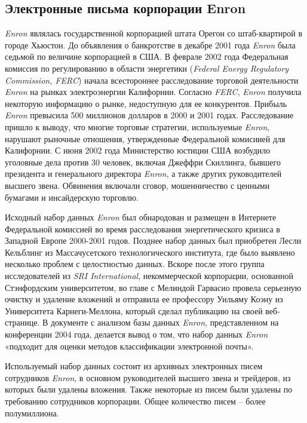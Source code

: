 \subsection{Электронные письма корпорации Enron}

\textit{Enron} являлась государственной корпорацией штата Орегон со штаб-квартирой в городе Хьюстон. До объявления о банкротстве в декабре 2001 года \textit{Enron} была седьмой по величине корпорацией в США. В феврале 2002 года Федеральная комиссия по регулированию в области энергетики 
(\textit{Federal Energy Regulatory Commission, FERC}) начала всестороннее расследование торговой деятельности \textit{Enron} на рынках электроэнергии Калифорнии. Согласно 
\textit{FERC}, \textit{Enron} получила некоторую информацию о рынке, недоступную для ее конкурентов. Прибыль \textit{Enron} превысила 500 миллионов долларов в 2000 и 2001 годах. Расследование пришло к выводу, что многие торговые стратегии, используемые 
\textit{Enron}, нарушают рыночные отношения, утвержденные Федеральной комисиией для Калифорнии. С июня 2002 года Министерство юстиции США возбудило уголовные дела против 30 человек, включая Джеффри Скиллинга, бывшего президента и генерального директора 
\textit{Enron}, а также других руководителей высшего звена. Обвинения включали сговор, мошенничество с ценными бумагами и инсайдерскую торговлю.

Исходный набор данных \textit{Enron} был обнародован и размещен в Интернете Федеральной комиссией во время расследования энергетического кризиса в Западной Европе 2000-2001 годов. Позднее набор данных был приобретен Лесли Кельблинг из Массачусетского технологического института, где было выявлено несколько проблем с целостностью данных. Вскоре после этого группа исследователей из \textit{SRI International}, некоммерческой корпорации, основанной Стэнфордским университетом, во главе с Мелиндой Гарвасио провела серьезную очистку и удаление вложений и отправила ее профессору Уильяму Коэну из Университета Карнеги-Меллона, который сделал публикацию на своей веб-странице. В документе с анализом базы данных 
\textit{Enron}, представленном на конференции 2004 года, делается вывод о том, что набор данных \textit{Enron} «подходит для оценки методов классификации электронной почты».

Используемый набор данных состоит из архивных электронных писем сотрудников \textit{Enron}, в основном  руководителей высшего звена и трейдеров, из которых были удалены вложения. Также некоторые из писем были удалены по требованию сотрудников корпорации. Общее количество писем -- более полумиллиона.
